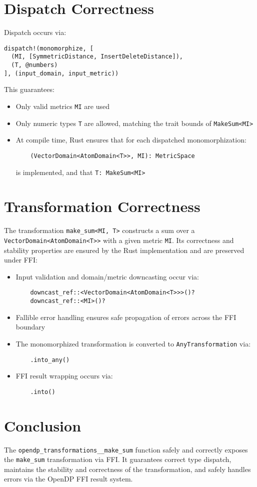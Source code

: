 \documentclass{article}
\begin{document}
\section{Dispatch Correctness}

Dispatch occurs via:
\begin{verbatim}
dispatch!(monomorphize, [
  (MI, [SymmetricDistance, InsertDeleteDistance]),
  (T, @numbers)
], (input_domain, input_metric))
\end{verbatim}

This guarantees:
\begin{itemize}
  \item Only valid metrics \texttt{MI} are used
  \item Only numeric types \texttt{T} are allowed, matching the trait bounds of \texttt{MakeSum<MI>}
  \item At compile time, Rust ensures that for each dispatched monomorphization:
    \begin{verbatim}
    (VectorDomain<AtomDomain<T>>, MI): MetricSpace
    \end{verbatim}
    is implemented, and that \texttt{T: MakeSum<MI>}
\end{itemize}

\section{Transformation Correctness}

The transformation \texttt{make\_sum<MI, T>} constructs a sum over a \texttt{VectorDomain<AtomDomain<T>>} with a given metric \texttt{MI}. Its correctness and stability properties are ensured by the Rust implementation and are preserved under FFI:

\begin{itemize}
  \item Input validation and domain/metric downcasting occur via:
    \begin{verbatim}
    downcast_ref::<VectorDomain<AtomDomain<T>>>()?
    downcast_ref::<MI>()?
    \end{verbatim}
  \item Fallible error handling ensures safe propagation of errors across the FFI boundary
  \item The monomorphized transformation is converted to \texttt{AnyTransformation} via:
    \begin{verbatim}
    .into_any()
    \end{verbatim}
  \item FFI result wrapping occurs via:
    \begin{verbatim}
    .into()
    \end{verbatim}
\end{itemize}

\section{Conclusion}

The \texttt{opendp\_transformations\_\_make\_sum} function safely and correctly exposes the \texttt{make\_sum} transformation via FFI. It guarantees correct type dispatch, maintains the stability and correctness of the transformation, and safely handles errors via the OpenDP FFI result system.
\end{document}
